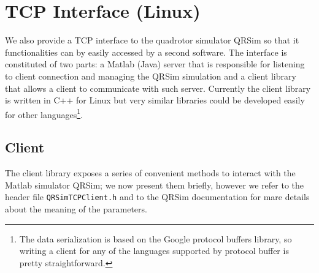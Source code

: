 \documentclass[a4paper,11pt]{report}
\begin{document}
\section{TCP Interface (Linux)}

We also provide a TCP interface to the quadrotor simulator QRSim so that it functionalities can by easily accessed by a second software. 
The interface is constituted of two parts: a Matlab (Java) server that is responsible for listening to client connection and managing the QRSim simulation and a client library that allows a client to communicate with such server.
Currently the client library is written in C++ for Linux but very similar libraries could be developed easily for other languages\footnote{The data serialization is based on the Google protocol buffers library, so writing a client for any of the languages supported by protocol buffer is pretty straightforward.}.

\subsection{Client}

The client library exposes a series of convenient methods to interact with the Matlab simulator QRSim; we now present them briefly, however we refer to the header file \texttt{QRSimTCPClient.h} and to the QRSim documentation for mare details about the meaning of the parameters.
\end{document}
